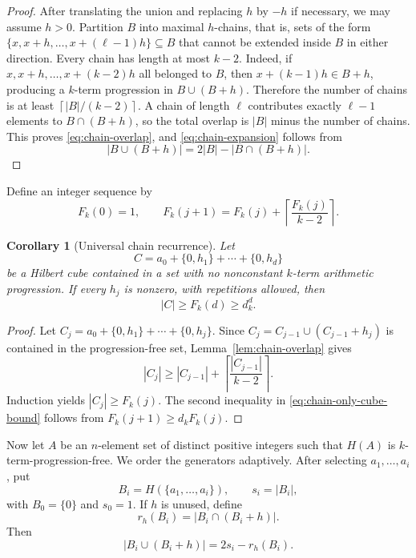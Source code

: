 \documentclass[11pt]{article}
\numberwithin{equation}{section}
\newtheorem{corollary}[theorem]{Corollary}
\theoremstyle{definition}
\theoremstyle{remark}
\newcommand{\ceil}[1]{\left\lceil #1\right\rceil}
\begin{document}
\begin{proof}
After translating the union and replacing $h$ by $-h$ if necessary, we may assume $h>0$. Partition $B$ into maximal $h$-chains, that is, sets of the form $\{x,x+h,\ldots,x+(\ell-1)h\}\subseteq B$ that cannot be extended inside $B$ in either direction. Every chain has length at most $k-2$. Indeed, if $x,x+h,\ldots,x+(k-2)h$ all belonged to $B$, then $x+(k-1)h\in B+h$, producing a $k$-term progression in $B\cup(B+h)$. Therefore the number of chains is at least $\ceil{|B|/(k-2)}$. A chain of length $\ell$ contributes exactly $\ell-1$ elements to $B\cap(B+h)$, so the total overlap is $|B|$ minus the number of chains. This proves \eqref{eq:chain-overlap}, and \eqref{eq:chain-expansion} follows from
\[
|B\cup(B+h)|=2|B|-|B\cap(B+h)|.
\]
\end{proof}

\noindent
Define an integer sequence by
\begin{equation}\label{eq:Fk-recurrence}
F_k(0)=1,
\qquad
F_k(j+1)=F_k(j)+\ceil{\frac{F_k(j)}{k-2}}.
\end{equation}

\begin{corollary}[Universal chain recurrence]\label{cor:chain-only-recurrence}
Let
\[
C=a_0+\{0,h_1\}+\cdots+\{0,h_d\}
\]
be a Hilbert cube contained in a set with no nonconstant $k$-term arithmetic progression. If every $h_j$ is nonzero, with repetitions allowed, then
\begin{equation}\label{eq:chain-only-cube-bound}
|C|\ge F_k(d)\ge d_k^d.
\end{equation}
\end{corollary}

\begin{proof}
Let $C_j=a_0+\{0,h_1\}+\cdots+\{0,h_j\}$. Since $C_j=C_{j-1}\cup(C_{j-1}+h_j)$ is contained in the progression-free set, Lemma~\ref{lem:chain-overlap} gives
\[
|C_j|\ge |C_{j-1}|+\ceil{\frac{|C_{j-1}|}{k-2}}.
\]
Induction yields $|C_j|\ge F_k(j)$. The second inequality in \eqref{eq:chain-only-cube-bound} follows from $F_k(j+1)\ge d_kF_k(j)$.
\end{proof}

\smallskip
\noindent
Now let $A$ be an $n$-element set of distinct positive integers such that $H(A)$ is $k$-term-progression-free. We order the generators adaptively. After selecting $a_1,\ldots,a_i$, put
\begin{equation}\label{eq:partial-cube}
B_i=H(\{a_1,\ldots,a_i\}),
\qquad
s_i=|B_i|,
\end{equation}
with $B_0=\{0\}$ and $s_0=1$. If $h$ is unused, define
\begin{equation}\label{eq:overlap-definition}
r_h(B_i)=|B_i\cap(B_i+h)|.
\end{equation}
Then
\begin{equation}\label{eq:union-overlap}
|B_i\cup(B_i+h)|=2s_i-r_h(B_i).
\end{equation}
\end{document}
